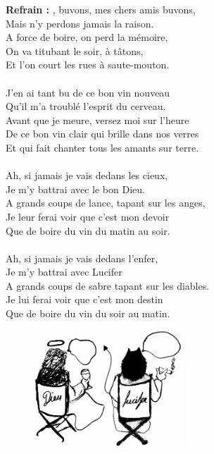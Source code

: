 
\textbf{Refrain :}
, buvons, mes chers amis buvons,
\\Mais n'y perdons jamais la raison.
\\A force de boire, on perd la mémoire,
\\On va titubant le soir, à tâtons,
\\Et l'on court les rues à saute-mouton.
\\\\J'en ai tant bu de ce bon vin nouveau
\\Qu'il m'a troublé l'esprit du cerveau.
\\Avant que je meure, versez moi sur l'heure
\\De ce bon vin clair qui brille dans nos verres
\\Et qui fait chanter tous les amants sur terre.
\\\\Ah, si jamais je vais dedans les cieux,
\\Je m'y battrai avec le bon Dieu.
\\A grands coups de lance, tapant sur les anges,
\\Je leur ferai voir que c'est mon devoir
\\Que de boire du vin du matin au soir.
\\\\Ah, si jamais je vais dedans l'enfer,
\\Je m'y battrai avec Lucifer
\\A grands coups de sabre tapant sur les diables.
\\Je lui ferai voir que c'est mon destin
\\Que de boire du vin du soir au matin.
\begin{figure}[h!]
\centering
   \includegraphics[width=0.5\textwidth]{images/amis_buvons.png}
 \end{figure}

\breakpage